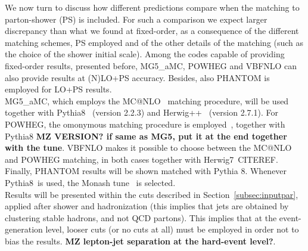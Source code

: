 We now turn to discuss how different predictions compare when the matching to parton-shower (PS) is included. For such
a comparison we expect larger discrepancy than what we found at fixed-order, as a consequence of the different
matching schemes, PS employed and of the other details of the matching (such as the choice of the shower initial scale). Among
the codes capable of providing fixed-order results, presented before, {\sc MG5\_aMC}, {\sc POWHEG} and {\sc VBFNLO}
can also provide results at (N)LO+PS accuracy. Besides, also {\sc PHANTOM} is employed for LO+PS results.\\
{\sc MG5\_aMC},
which
employs the {\sc MC@NLO}~\cite{Frixione:2002ik} matching procedure, will be used together with {\sc Pythia8}~\cite{Sjostrand:2014zea} (version 2.2.3)
and {\sc Herwig++}~\cite{Bahr:2008pv, Bellm:2013hwb} (version 2.7.1). For {\sc POWHEG}, the omonymous matching procedure is 
employed~\cite{Nason:2004rx,Frixione:2007vw}, together with {\sc Pythia8}
{\bf MZ VERSION? if same as MG5, put it at the end together with the tune}. {\sc VBFNLO} makes it possible to choose between the {\sc MC@NLO} and {\sc POWHEG}
matching, in both cases together with {\sc Herwig7}~CITEREF. Finally, {\sc PHANTOM} results will be shown matched with {\sc Pythia 8}.
Whenever {\sc Pythia8}\ is used, the Monash tune~\cite{Skands:2014pea} is selected.\\

Results will be presented within the cuts described in Section~\ref{subsec:inputpar}, applied after shower and hadronization (this implies that jets
are obtained by clustering stable hadrons, and not QCD partons). This implies that at the event-generation level, looser cuts (or no cuts at all)
must be employed in order not to bias the results. {\bf MZ lepton-jet separation at the hard-event level?}.\\

